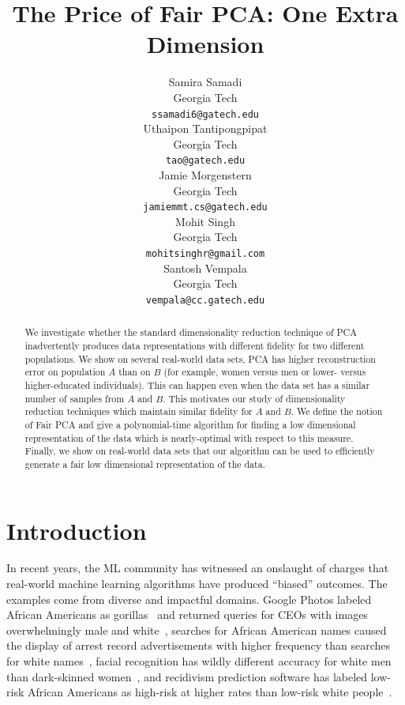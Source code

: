 \documentclass{article}
\title{The Price of Fair PCA: One Extra Dimension}
\author{
   Samira Samadi \\
   Georgia Tech \\
   \texttt{ssamadi6@gatech.edu}\\
\And
Uthaipon Tantipongpipat \\
  Georgia Tech \\
  \texttt{tao@gatech.edu} \\
 \And
Jamie Morgenstern \\
  Georgia Tech \\
  \texttt{jamiemmt.cs@gatech.edu} \\
 \AND
 Mohit Singh \\
  Georgia Tech \\
  \texttt{mohitsinghr@gmail.com} \\
 \And
Santosh Vempala \\
 Georgia Tech \\
 \texttt{vempala@cc.gatech.edu} \\
}
\begin{document}
\maketitle

\begin{abstract}
  
  We investigate whether the standard dimensionality
  reduction technique of PCA inadvertently produces data
  representations with different fidelity for two different
  populations. We show on several real-world data sets, PCA has higher
  reconstruction error on population $A$ than 
  on 
  $B$ (for example, women
  versus men or lower- versus higher-educated individuals).
  This can happen even when the data set has a similar number of samples from $A$ and $B$.
  This motivates our study of dimensionality reduction
  techniques which maintain similar fidelity for $A$ and $B$. We define the notion of Fair PCA and give a
  polynomial-time algorithm for finding a low dimensional representation of the data which is
  nearly-optimal with respect to this measure. Finally, we show on real-world data sets that our algorithm can be used to  efficiently generate a fair low dimensional representation of the data. 
  \end{abstract}

\section{Introduction}



In recent years, the ML community has witnessed an onslaught of
charges that real-world machine learning algorithms have produced
``biased'' outcomes. The examples come from diverse and impactful
domains.  Google Photos labeled African Americans as
gorillas~\citep{twitter,simonite_2018} and returned queries for CEOs
with images overwhelmingly male and white~\citep{kay2015unequal},
searches for African American names caused the display of arrest
record advertisements with higher frequency than searches for white
names~\citep{Sweeney13}, facial recognition has wildly different
accuracy for white men than dark-skinned women~\citep{gendershades},
and recidivism prediction software has labeled low-risk African
Americans as high-risk at higher rates than low-risk white
people~\citep{propublica}.
\end{document}

